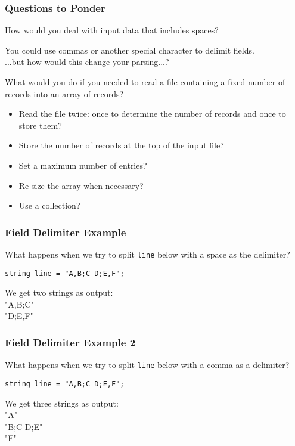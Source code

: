 \begin{frame}
\frametitle{Questions to Ponder}
How would you deal with input data that includes spaces?

You could use commas or another special character to delimit fields.\\
\quad ...but how would this change your parsing...?

What would you do if you needed to read a file containing a fixed number of records into an array of records?
\begin{itemize}
    \item Read the file twice: once to determine the number of records and once to store them?
    \item Store the number of records at the top of the input file?
    \item Set a maximum number of entries?
    \item Re-size the array when necessary?
    \item Use a collection?
\end{itemize}

\end{frame}

\begin{frame}[fragile]
\frametitle{Field Delimiter Example}

What happens when we try to split \texttt{line} below with a space as the delimiter?

\begin{verbatim}
string line = "A,B;C D;E,F";
\end{verbatim}

We get two strings as output:\\
\quad "A,B;C"\\
\quad "D;E,F"

\end{frame}

\begin{frame}[fragile]
\frametitle{Field Delimiter Example 2}

What happens when we try to split \texttt{line} below with a comma as a delimiter?

\begin{verbatim}
string line = "A,B;C D;E,F";
\end{verbatim}

We get three strings as output:\\
\quad "A"\\
\quad "B;C D;E"\\
\quad "F"

\end{frame}

